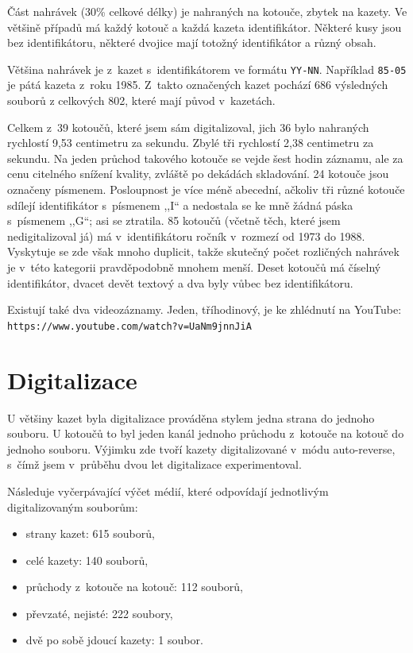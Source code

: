 Část nahrávek (30\% celkové délky) je nahraných na kotouče, zbytek na kazety. Ve
většině případů má každý kotouč a každá kazeta identifikátor. Některé kusy
jsou bez identifikátoru, některé dvojice mají totožný identifikátor a různý
obsah.

Většina nahrávek je z~kazet s~identifikátorem ve formátu \texttt{YY-NN}.
Například \texttt{85-05} je pátá kazeta z~roku 1985. Z~takto označených kazet
pochází 686 výsledných souborů z celkových 802, které mají původ v~kazetách.

Celkem z~39 kotoučů, které jsem sám digitalizoval, jich 36 bylo nahraných
rychlostí 9,53 centimetru za sekundu. Zbylé tři rychlostí 2,38 centimetru za sekundu. Na jeden
průchod takového kotouče se vejde šest hodin záznamu, ale za cenu citelného
snížení kvality, zvláště po dekádách skladování. 24 kotouče jsou označeny
písmenem. Posloupnost je více méně abecední, ačkoliv tři různé kotouče sdílejí
identifikátor s~písmenem ,,I`` a nedostala se ke mně žádná páska s~písmenem
,,G``; asi se ztratila. 85 kotoučů (včetně těch, které jsem nedigitalizoval já)
má v~identifikátoru ročník v~rozmezí od 1973 do 1988. Vyskytuje se zde však
mnoho duplicit, takže skutečný počet rozličných nahrávek je v~této kategorii
pravděpodobně mnohem menší. Deset kotoučů má číselný identifikátor, dvacet devět
textový a dva byly vůbec bez identifikátoru.

Existují také dva videozáznamy. Jeden, tříhodinový, je ke zhlédnutí na YouTube:
\texttt{https://www.youtube.com/watch?v=UaNm9jnnJiA}

\section{Digitalizace}
\label{sec:data:digitisation}

U většiny kazet byla digitalizace prováděna stylem jedna strana do jednoho
souboru. U kotoučů to byl jeden kanál jednoho průchodu z~kotouče na kotouč do
jednoho souboru. Výjimku zde tvoří kazety digitalizované v~módu auto-reverse,
s~čímž jsem v~průběhu dvou let digitalizace experimentoval.

Následuje vyčerpávající výčet médií, které odpovídají jednotlivým
digitalizovaným souborům:

\begin{itemize}
\item{strany kazet: 615 souborů,}
\item{celé kazety: 140 souborů,}
\item{průchody z~kotouče na kotouč: 112 souborů,}
\item{převzaté, nejisté: 222 soubory,}
\item{dvě po sobě jdoucí kazety: 1 soubor.}
\end{itemize}

